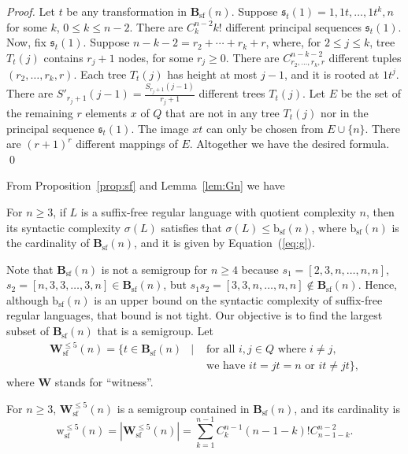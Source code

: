 \documentclass{llncs}
\renewcommand{\le}{\leqslant}
\renewcommand{\ge}{\geqslant}
\newcommand{\txt}[1]{\mbox{ #1 }}
\newcommand{\seq}{{\mathfrak{s}}}
\newcommand{\Bsf}{\mathbf{B}_{\mathrm{sf}}}
\newcommand{\Vsf}{\mathbf{W}^{\le 5}_{\mathrm{sf}}}
\newcommand{\bsf}{{\mathrm{b}_{\mathrm{sf}}}}
\newcommand{\vsf}{{\mathrm{w}^{\le 5}_{\mathrm{sf}}}}
\begin{document}
\begin{proof} 
Let $t$ be any transformation in $\Bsf(n)$. Suppose $\seq_t(1) = 1,1t,\ldots,1t^k,n$ for some $k$, $0 \le k \le n-2$. There are $C^{n-2}_k k!$ different principal sequences $\seq_t(1)$. Now, fix $\seq_t(1)$. Suppose $n-k-2 = r_2 + \cdots + r_k + r$, where, for $2 \le j \le k$, tree $T_t(j)$ contains $r_j+1$ nodes, for some $r_j \ge 0$. There are $C^{n-k-2}_{r_2,\ldots,r_k,r}$ different tuples $(r_2,\ldots,r_k,r)$. Each tree $T_t(j)$ has height at most $j-1$, and it is rooted at $1t^j$. There are $S'_{r_j+1}(j-1) = \frac{S_{r_j+1}(j-1)}{r_j + 1}$ different trees $T_t(j)$. Let $E$ be the set of the remaining $r$ elements $x$ of $Q$ that are not in any tree $T_t(j)$ nor in the principal sequence $\seq_t(1)$. The image $xt$ can only be chosen from $E \cup \{n\}$. There are $(r+1)^r$ different mappings of $E$. Altogether we have the desired formula. \qed
\end{proof}


From Proposition~\ref{prop:sf} and Lemma~\ref{lem:Gn} we have 

\begin{proposition}\label{prop:Gncard} 
For $n \ge 3$, if $L$ is a suffix-free regular language with quotient complexity $n$, then its syntactic complexity $\sigma(L)$ satisfies that $\sigma(L) \le \bsf(n)$, where $\bsf(n)$ is the cardinality of $\Bsf(n)$, and it is given by Equation~(\ref{eq:g}). 
\end{proposition}

Note that $\Bsf(n)$ is not a semigroup for $n \ge 4$ because $s_1 = [2,3,n,\ldots,n,n]$, $s_2 = [n,3,3,\ldots,3,n] \in \Bsf(n)$, but $s_1s_2 = [3,3,n,\ldots,n,n] \not\in \Bsf(n)$. Hence, although $\bsf(n)$ is an upper bound on the syntactic complexity of suffix-free regular languages, that bound is not tight. Our objective is to find the largest subset of $\Bsf(n)$ that is a semigroup. Let
\begin{eqnarray*}
\Vsf(n) = \{t \in \Bsf(n) &\mid& \txt{for all} i, j \in Q \txt{where} i \neq j, \\ 
&& \txt{we have} it = jt = n \txt{or} it \neq jt\},
\end{eqnarray*}
where $\mathbf{W}$ stands for ``witness''.

\begin{proposition}\label{prop:Pncard}
For $n \ge 3$, $\Vsf(n)$ is a semigroup contained in $\Bsf(n)$, and its cardinality is
\begin{equation*}
\vsf(n) = |\Vsf(n)| = \sum_{k = 1}^{n-1} {C^{n-1}_k}(n-1-k)!{C^{n-2}_{n-1-k}}.
\end{equation*}
\end{proposition}
\end{document}
